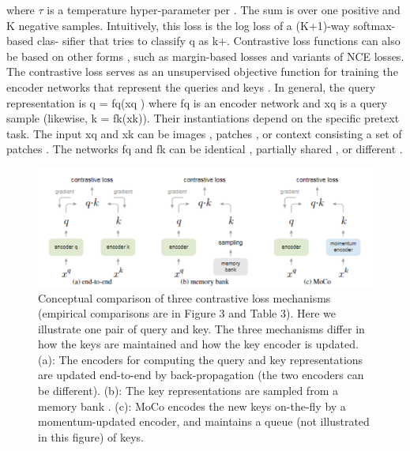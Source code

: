 \documentclass[10pt,twocolumn]{article}  %
\begin{document}
where $\tau$ is a temperature hyper-parameter per \cite{61_wu2018unsupervised}. The sum
is over one positive and K negative samples. Intuitively,
this loss is the log loss of a (K+1)-way softmax-based clas-
siﬁer that tries to classify q as k+. Contrastive loss functions
can also be based on other forms \cite{29_hadsell2006dimensionality, 59_wang2015unsupervised, 61_wu2018unsupervised, 36_hjelm2019learning}, such as
margin-based losses and variants of NCE losses.
The contrastive loss serves as an unsupervised objective
function for training the encoder networks that represent the
queries and keys \cite{29_hadsell2006dimensionality}. In general, the query representation
is q = fq(xq ) where fq is an encoder network and xq is a
query sample (likewise, k = fk(xk)). Their instantiations
depend on the speciﬁc pretext task. The input xq and xk can
be images \cite{29_hadsell2006dimensionality, 61_wu2018unsupervised, 63_ye2019unsupervised}, patches \cite{46_oord2018representation}, or context consisting a
set of patches \cite{46_oord2018representation}. The networks fq and fk can be identical
\cite{29_hadsell2006dimensionality, 59_wang2015unsupervised, 63_ye2019unsupervised}, partially shared \cite{46_oord2018representation, 36_hjelm2019learning, 2_bachman2019learning}, or different \cite{56_tian2019contrastive}.

\begin{figure}[htbp]
    \centering
    \includegraphics[width=0.8\linewidth]{Pic/figure2.png} %
    \caption{Conceptual comparison of three contrastive loss mechanisms (empirical comparisons are in Figure 3 and Table 3). Here we
    illustrate one pair of query and key. The three mechanisms differ in how the keys are maintained and how the key encoder is updated.
    (a): The encoders for computing the query and key representations are updated end-to-end by back-propagation (the two encoders can
    be different). (b): The key representations are sampled from a memory bank \cite{61_wu2018unsupervised}. (c): MoCo encodes the new keys on-the-ﬂy by a
    momentum-updated encoder, and maintains a queue (not illustrated in this ﬁgure) of keys.} %
    \label{fig:Figure 2} %
\end{figure}
\end{document}
